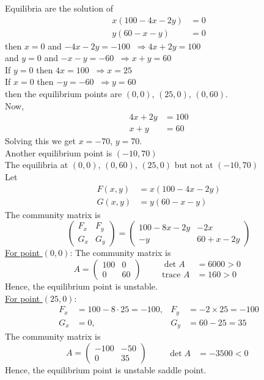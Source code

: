 \documentclass[../main-sheet.tex]{subfiles}
\begin{document}
\begin{soln}
    Equilibria are the solution of
    \begin{align*}
        x(100-4x-2y)&=0\\
        y(60-x-y)&=0
    \end{align*}
    then \(x=0\) and \(-4x-2y=-100\;\;\Rightarrow 4x+2y=100\)\\
    and \(y=0\) and \(-x-y=-60\;\;\Rightarrow x+y=60\)\\
    If \(y=0\) then \(4x=100\;\;\Rightarrow x=25\)\\
    If \(x=0\) then \(-y=-60\;\;\Rightarrow y=60\)\\
    then the equilibrium points are \((0,0)\), \((25,0)\), \((0,60)\).\\
    Now,
    \begin{align*}
        4x+2y&=100\\
        x+y&=60
    \end{align*}
    Solving this we get \(x=-70\), \(y=70\).\\
    Another equilibrium point is \((-10,70)\)\\
    The equilibria at \((0,0)\), \((0,60)\), \((25,0)\) but not at \((-10,70)\)\\
    Let \begin{align*}
        F(x,y)&=x(100-4x-2y)\\
        G(x,y)&=y(60-x-y)
    \end{align*}
    The community matrix is 
    \[\begin{pmatrix}
        F_x & F_y\\
        G_x & G_y
    \end{pmatrix}=\begin{pmatrix}
        100-8x-2y & -2x\\
        -y & 60+x-2y
    \end{pmatrix}\]
    \underline{For point \((0,0)\)}: The community matrix is 
    \[A=\begin{pmatrix}
        100&0\\
        0&60
    \end{pmatrix}\qquad \begin{aligned}
        \det A&=6000>0\\
        \text{trace } A&=160>0
    \end{aligned}\]
    Hence, the equilibrium point is unstable.\\


    \underline{For point \((25,0)\)}:
    \begin{align*}
        F_x&=100-8\cdot 25=-100, &F_y&=-2\times 25=-100\\
        G_x&=0, &G_y&=60-25=35
    \end{align*} 
    The community matrix is 
    \[A=\begin{pmatrix}
        -100&-50\\
        0&35
    \end{pmatrix}\qquad \begin{aligned}
        \det A&=-3500<0
    \end{aligned}\]
    Hence, the equilibrium point is unstable saddle point.\\
    

\end{soln}
\end{document}
